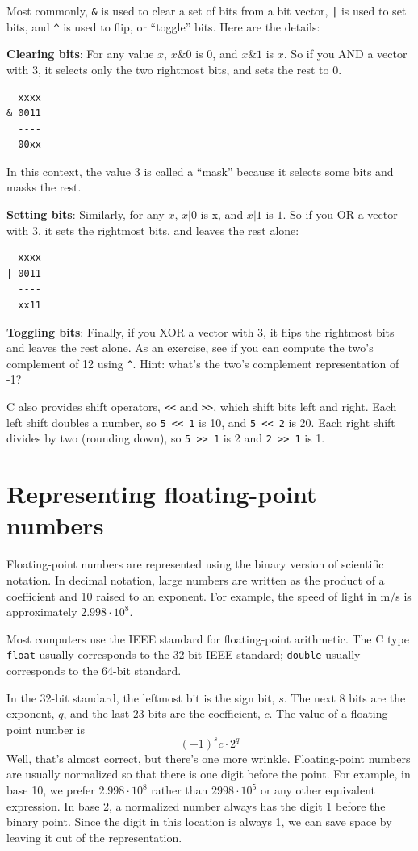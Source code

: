 \documentclass[12pt]{book}
\begin{document}
{Most commonly, \verb"&" is used to clear a set of bits from
a bit vector, \verb"|" is used to set bits, and \verb"^"
is used to flip, or ``toggle'' bits.  Here are the details:

{\bf Clearing bits}: For any value $x$, $x \& 0$ is 0, and $x \& 1$ is $x$.
So if you AND a vector with 3, it 
selects only the two rightmost bits, and sets the rest to 0.
%
\begin{verbatim}
  xxxx
& 0011
  ----
  00xx
\end{verbatim}
%
In this context, the value 3 is called a ``mask'' because it
selects some bits and masks the rest.

{\bf Setting bits}: Similarly, for any $x$, $x | 0$ is x, and $x | 1$ is $1$.
So if you OR a vector with 3, it sets the rightmost
bits, and leaves the rest alone:
%
\begin{verbatim}
  xxxx
| 0011
  ----
  xx11
\end{verbatim}
%
{\bf Toggling bits}: Finally, if you XOR a vector with 3, it flips the
rightmost bits and leaves the rest alone.  As an exercise, see if you
can compute the two's complement of 12 using \verb"^".  Hint: what's
the two's complement representation of -1?


C also provides shift operators, {\tt <<} and {\tt >>}, which shift
bits left and right.  Each left shift doubles a number, so
{\tt 5 << 1} is 10, and {\tt 5 << 2} is 20.  Each right shift
divides by two (rounding down), so {\tt 5 >> 1} is 2 and
{\tt 2 >> 1} is 1.


\section{Representing floating-point numbers}

Floating-point numbers are represented using the binary
version of scientific notation.  In decimal notation, large
numbers are written as the product of a coefficient and 10 raised
to an exponent.  For example, the speed of light in m/s is
approximately $2.998 \cdot 10^8$.

Most computers use the IEEE standard for floating-point
arithmetic.  The C type {\tt float} usually corresponds
to the 32-bit IEEE standard; {\tt double} usually corresponds
to the 64-bit standard.

In the 32-bit standard, the leftmost bit is the sign bit, $s$.
The next 8 bits are the exponent, $q$, and the last 23 bits are
the coefficient, $c$.  The value of a floating-point number is
%
\[ (-1)^s c \cdot 2^q \]
%
Well, that's almost correct, but there's one more wrinkle.
Floating-point numbers are usually normalized so that there is
one digit before the point.  For example, in base 10, we prefer
$2.998 \cdot 10^8$ rather than $2998 \cdot 10^5$ or any other
equivalent expression.  In base 2, a normalized number always
has the digit 1 before the binary point.  Since the digit in
this location is always 1, we can save space by leaving it
out of the representation.

}
\end{document}
